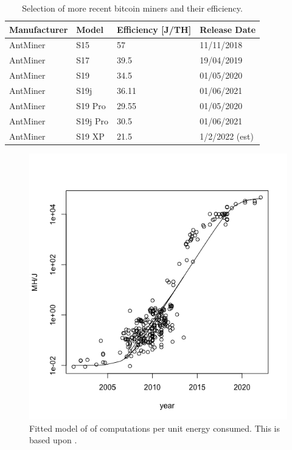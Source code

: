 \documentclass[runningheads]{llncs}
\begin{document}
\begin{table}
    \caption{Selection of more recent bitcoin miners and their efficiency.}\label{tbl:1}
    \begin{tabular}{|l|l|l|l|}
        \hline
        Manufacturer &  Model   & Efficiency [J/TH] & Release Date   \\
        \hline
        AntMiner     & S15      &57                 & 11/11/2018     \\
        AntMiner     & S17      &39.5               & 19/04/2019     \\
        AntMiner     & S19      &34.5               & 01/05/2020     \\
        AntMiner     & S19j     &36.11              & 01/06/2021     \\
        AntMiner     & S19 Pro  &29.55              & 01/05/2020     \\
        AntMiner     & S19j Pro &30.5               & 01/06/2021     \\
        AntMiner     & S19 XP   &21.5               & 1/2/2022 (est) \\
        \hline
    \end{tabular}
\end{table}

\begin{figure}
    \includegraphics[width=\textwidth]{BTC Mining Performance.png}
    \caption{Fitted model of of computations per unit energy consumed. This is based upon \cite{rupp2020trends}.} \label{fig:3}
\end{figure}
\end{document}
